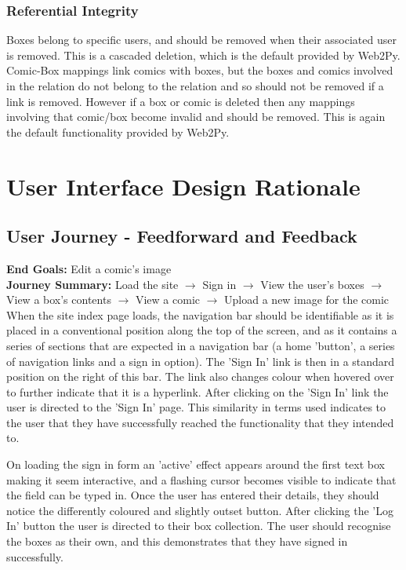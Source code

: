 \documentclass{scrreprt}
\begin{document}
\subsection{Referential Integrity}

Boxes belong to specific users, and should be removed when their associated user is removed. This is a cascaded deletion, which is the default provided by Web2Py.\\

Comic-Box mappings link comics with boxes, but the boxes and comics involved in the relation do not belong to the relation and so should not be removed if a link is removed. However if a box or comic is deleted then any mappings involving that comic/box become invalid and should be removed. This is again the default functionality provided by Web2Py.
	

\chapter{User Interface Design Rationale}

\section{User Journey - Feedforward and Feedback}

\textbf{End Goals:} Edit a comic's image\\
\textbf{Journey Summary:} Load the site $\rightarrow$ Sign in $\rightarrow$ View the user's boxes $\rightarrow$ View a box's contents $\rightarrow$ View a comic $\rightarrow$ Upload a new image for the comic\\

When the site index page loads, the navigation bar should be identifiable as it is placed in a conventional position along the top of the screen, and as it contains a series of sections that are expected in a navigation bar (a home 'button', a series of navigation links and a sign in option). The 'Sign In' link is then in a standard position on the right of this bar. The link also changes colour when hovered over to further indicate that it is a hyperlink. After clicking on the 'Sign In' link the user is directed to the 'Sign In' page. This similarity in terms used indicates to the user that they have successfully reached the functionality that they intended to.

On loading the sign in form an 'active' effect appears around the first text box making it seem interactive, and a flashing cursor becomes visible to indicate that the field can be typed in. Once the user has entered their details, they should notice the differently coloured and slightly outset button. After clicking the 'Log In' button the user is directed to their box collection. The user should recognise the boxes as their own, and this demonstrates that they have signed in successfully.
\end{document}
